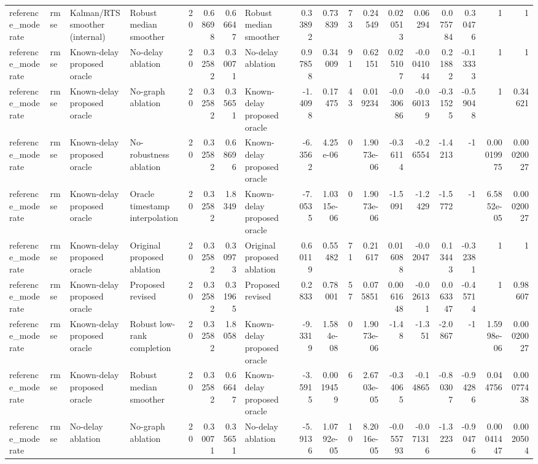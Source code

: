 \begin{table}[!htbp]
{\begin{tabular}{llllrrrlrrrrrrrrrr}
reference_moderate & rmse & Kalman/RTS smoother (internal) & Robust median smoother & 20 & 0.68698 & 0.66647 & Robust median smoother & 0.33892 & 0.73839 & 73 & 0.24549 & 0.020513 & 0.06294 & 0.075784 & 0.30476 & 1 & 1 \\
reference_moderate & rmse & Known-delay proposed oracle & No-delay ablation & 20 & 0.32582 & 0.30071 & No-delay ablation & 0.97858 & 0.34009 & 91 & 0.62151 & 0.025107 & -0.0041044 & 0.21882 & -0.13333 & 1 & 1 \\
reference_moderate & rmse & Known-delay proposed oracle & No-graph ablation & 20 & 0.32582 & 0.35651 & Known-delay proposed oracle & -1.4098 & 0.17475 & 43 & 0.019234 & -0.030686 & -0.060139 & -0.31525 & -0.59048 & 1 & 0.34621 \\
reference_moderate & rmse & Known-delay proposed oracle & No-robustness ablation & 20 & 0.32582 & 0.68696 & Known-delay proposed oracle & -6.3562 & 4.25e-06 & 0 & 1.9073e-06 & -0.36114 & -0.26554 & -1.4213 & -1 & 0.00019975 & 0.00020027 \\
reference_moderate & rmse & Known-delay proposed oracle & Oracle timestamp interpolation & 20 & 0.32582 & 1.8349 & Known-delay proposed oracle & -7.0535 & 1.0315e-06 & 0 & 1.9073e-06 & -1.5091 & -1.2429 & -1.5772 & -1 & 6.5852e-05 & 0.00020027 \\
reference_moderate & rmse & Known-delay proposed oracle & Original proposed ablation & 20 & 0.32582 & 0.30973 & Original proposed ablation & 0.60119 & 0.55482 & 71 & 0.21617 & 0.016088 & -0.02047 & 0.13443 & -0.32381 & 1 & 1 \\
reference_moderate & rmse & Known-delay proposed oracle & Proposed revised & 20 & 0.32582 & 0.31965 & Proposed revised & 0.2833 & 0.78001 & 57 & 0.075851 & 0.0061648 & -0.026131 & 0.063347 & -0.45714 & 1 & 0.98607 \\
reference_moderate & rmse & Known-delay proposed oracle & Robust low-rank completion & 20 & 0.32582 & 1.8058 & Known-delay proposed oracle & -9.3319 & 1.584e-08 & 0 & 1.9073e-06 & -1.48 & -1.351 & -2.0867 & -1 & 1.5998e-06 & 0.00020027 \\
reference_moderate & rmse & Known-delay proposed oracle & Robust median smoother & 20 & 0.32582 & 0.66647 & Known-delay proposed oracle & -3.5915 & 0.0019459 & 6 & 2.6703e-05 & -0.34065 & -0.14865 & -0.80307 & -0.94286 & 0.044756 & 0.00077438 \\
reference_moderate & rmse & No-delay ablation & No-graph ablation & 20 & 0.30071 & 0.35651 & No-delay ablation & -5.9136 & 1.0792e-05 & 10 & 8.2016e-05 & -0.055793 & -0.071316 & -1.3223 & -0.90476 & 0.00041447 & 0.0020504 \\

\end{tabular}}
\end{table}
